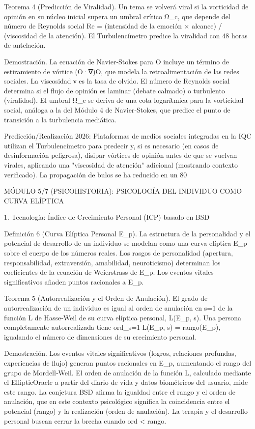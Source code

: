 \documentclass[12pt,a4paper]{book}
\begin{document}
Teorema 4 (Predicción de Viralidad). Un tema se volverá viral si la vorticidad de opinión en su núcleo inicial supera un umbral crítico Ω_c, que depende del número de Reynolds social Re = (intensidad de la emoción × alcance) / (viscosidad de la atención). El Turbulencímetro predice la viralidad con 48 horas de antelación.

Demostración. La ecuación de Navier‑Stokes para O incluye un término de estiramiento de vórtice (O·∇)O, que modela la retroalimentación de las redes sociales. La viscosidad ν es la tasa de olvido. El número de Reynolds social determina si el flujo de opinión es laminar (debate calmado) o turbulento (viralidad). El umbral Ω_c se deriva de una cota logarítmica para la vorticidad social, análoga a la del Módulo 4 de Navier‑Stokes, que predice el punto de transición a la turbulencia mediática.

Predicción/Realización 2026: Plataformas de medios sociales integradas en la IQC utilizan el Turbulencímetro para predecir y, si es necesario (en casos de desinformación peligrosa), disipar vórtices de opinión antes de que se vuelvan virales, aplicando una "viscosidad de atención" adicional (mostrando contexto verificado). La propagación de bulos se ha reducido en un 80%

MÓDULO 5/7 (PSICOHISTORIA): PSICOLOGÍA DEL INDIVIDUO COMO CURVA ELÍPTICA

1. Tecnología: Índice de Crecimiento Personal (ICP) basado en BSD

Definición 6 (Curva Elíptica Personal E_p). La estructura de la personalidad y el potencial de desarrollo de un individuo se modelan como una curva elíptica E_p sobre el cuerpo de los números reales. Los rasgos de personalidad (apertura, responsabilidad, extraversión, amabilidad, neuroticismo) determinan los coeficientes de la ecuación de Weierstrass de E_p. Los eventos vitales significativos añaden puntos racionales a E_p.

Teorema 5 (Autorrealización y el Orden de Anulación). El grado de autorrealización de un individuo es igual al orden de anulación en s=1 de la función L de Hasse‑Weil de su curva elíptica personal, L(E_p, s). Una persona completamente autorrealizada tiene ord_{s=1} L(E_p, s) = rango(E_p), igualando el número de dimensiones de su crecimiento personal.

Demostración. Los eventos vitales significativos (logros, relaciones profundas, experiencias de flujo) generan puntos racionales en E_p, aumentando el rango del grupo de Mordell‑Weil. El orden de anulación de la función L, calculado mediante el EllipticOracle a partir del diario de vida y datos biométricos del usuario, mide este rango. La conjetura BSD afirma la igualdad entre el rango y el orden de anulación, que en este contexto psicológico significa la coincidencia entre el potencial (rango) y la realización (orden de anulación). La terapia y el desarrollo personal buscan cerrar la brecha cuando ord < rango.
\end{document}
